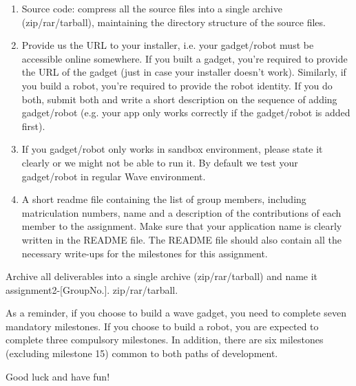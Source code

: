 \begin{enumerate}
    \item Source code: compress all the source files into a single
    archive (zip/rar/tarball), maintaining the directory structure of
    the source files.

    \item Provide us the URL to your installer, i.e. your gadget/robot must be 
    accessible online somewhere. If you built a gadget, you're required to provide 
    the URL of the gadget (just in case your installer doesn't work). Similarly,
    if you build a robot, you're required to provide the robot identity. If you
    do both, submit both and write a short description on the sequence of adding
    gadget/robot (e.g. your app only works correctly if the gadget/robot is added
    first).
    \item If you gadget/robot only works in sandbox environment, please state it 
    clearly or we might not be able to run it. By default we test your gadget/robot
    in regular Wave environment.
    \item A short readme file containing the list of group members,
    including matriculation numbers, name and a description of the
    contributions of each member to the assignment. Make sure that
    your application name is clearly written in the README file. The
    README file should also contain all the necessary write-ups for
    the milestones for this assignment.

\end{enumerate}

Archive all deliverables into a single archive (zip/rar/tarball) and
name it assignment2-[GroupNo.].{ zip/rar/tarball}. 

As a reminder, if you choose to build a wave gadget, you need to complete seven mandatory milestones. If you choose to build a robot, you are expected to complete three compulsory milestones. In addition, there are six milestones (excluding milestone 15) common to both paths of development.

Good luck and have fun!

 
 


